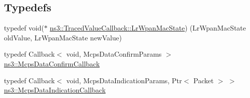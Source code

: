 \subsection*{Typedefs}
\begin{DoxyCompactItemize}
\item 
typedef void($\ast$ \hyperlink{group__lr-wpan_gab113a3a2c9eb8193a72835890954f1db}{ns3\+::\+Traced\+Value\+Callback\+::\+Lr\+Wpan\+Mac\+State}) (Lr\+Wpan\+Mac\+State old\+Value, Lr\+Wpan\+Mac\+State new\+Value)
\item 
typedef Callback$<$ void, Mcps\+Data\+Confirm\+Params $>$ \hyperlink{group__lr-wpan_ga00a61304d3d1c08a4fa8ae483f960001}{ns3\+::\+Mcps\+Data\+Confirm\+Callback}
\item 
typedef Callback$<$ void, Mcps\+Data\+Indication\+Params, Ptr$<$ Packet $>$ $>$ \hyperlink{group__lr-wpan_ga1635d218f83c7d0107b268080efd317b}{ns3\+::\+Mcps\+Data\+Indication\+Callback}
\end{DoxyCompactItemize}
